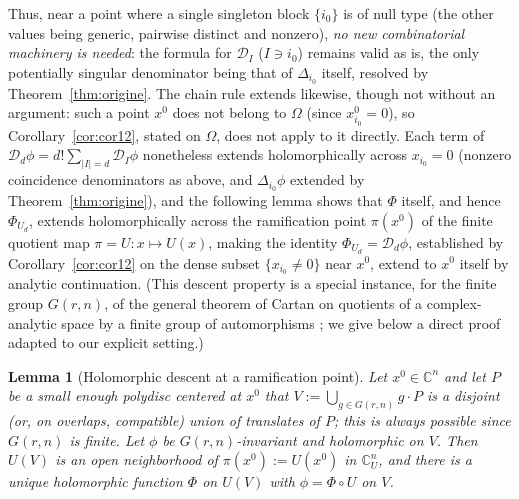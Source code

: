 \documentclass[11pt]{article}
\newtheorem{lemma}[theorem]{Lemma}
\theoremstyle{remark}
\newcommand{\CC}{\mathbb{C}}
\begin{document}
Thus, near a point where a single singleton block $\{i_0\}$ is of null type (the other values being generic, pairwise distinct and nonzero), \emph{no new combinatorial machinery is needed}: the formula for $\mathcal D_I$ ($I\ni i_0$) remains valid as is, the only potentially singular denominator being that of $\Delta_{i_0}$ itself, resolved by Theorem~\ref{thm:origine}. The chain rule extends likewise, though not without an argument: such a point $x^0$ does not belong to $\Omega$ (since $x_{i_0}^0=0$), so Corollary~\ref{cor:cor12}, stated on $\Omega$, does not apply to it directly. Each term of $\mathcal D_d\phi=d!\sum_{|I|=d}\mathcal D_I\phi$ nonetheless extends holomorphically across $x_{i_0}=0$ (nonzero coincidence denominators as above, and $\Delta_{i_0}\phi$ extended by Theorem~\ref{thm:origine}), and the following lemma shows that $\Phi$ itself, and hence $\Phi_{U_d}$, extends holomorphically across the ramification point $\pi(x^0)$ of the finite quotient map $\pi=U:x\mapsto U(x)$, making the identity $\Phi_{U_d}=\mathcal D_d\phi$, established by Corollary~\ref{cor:cor12} on the dense subset $\{x_{i_0}\ne0\}$ near $x^0$, extend to $x^0$ itself by analytic continuation. (This descent property is a special instance, for the finite group $G(r,n)$, of the general theorem of Cartan on quotients of a complex-analytic space by a finite group of automorphisms \cite{Cartan}; we give below a direct proof adapted to our explicit setting.)

\begin{lemma}[Holomorphic descent at a ramification point]\label{lem:Phi-holo}
Let $x^0\in\CC^n$ and let $P$ be a small enough polydisc centered at $x^0$ that $V:=\bigcup_{g\in G(r,n)}g\cdot P$ is a disjoint (or, on overlaps, compatible) union of translates of $P$; this is always possible since $G(r,n)$ is finite. Let $\phi$ be $G(r,n)$-invariant and holomorphic on $V$. Then $U(V)$ is an open neighborhood of $\pi(x^0):=U(x^0)$ in $\CC^n_U$, and there is a unique holomorphic function $\Phi$ on $U(V)$ with $\phi=\Phi\circ U$ on $V$.
\end{lemma}
\end{document}
